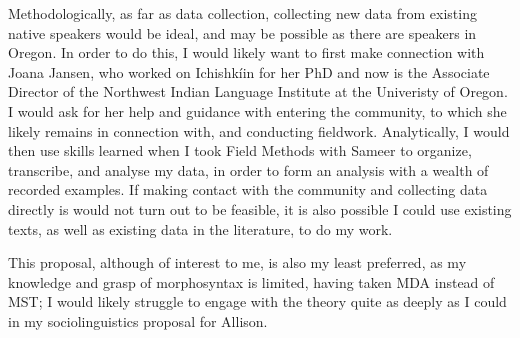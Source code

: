 \documentclass[11pt]{article}
\begin{document}
Methodologically, as far as data collection, collecting new data from existing native speakers would be ideal, and may be possible as there are speakers in Oregon. In order to do this, I would likely want to first make connection with Joana Jansen, who worked on Ichishkíin for her PhD and now is the Associate Director of the Northwest Indian Language Institute at the Univeristy of Oregon. I would ask for her help and guidance with entering the community, to which she likely remains in connection with, and conducting fieldwork. Analytically, I would then use skills learned when I took Field Methods with Sameer to organize, transcribe, and analyse my data, in order to form an analysis with a wealth of recorded examples. If making contact with the community and collecting data directly is would not turn out to be feasible, it is also possible I could use existing texts, as well as existing data in the literature, to do my work.

This proposal, although of interest to me, is also my least preferred, as my knowledge and grasp of morphosyntax is limited, having taken MDA instead of MST; I would likely struggle to engage with the theory quite as deeply as I could in my sociolinguistics proposal for Allison.

\printbibliography
\end{document}
